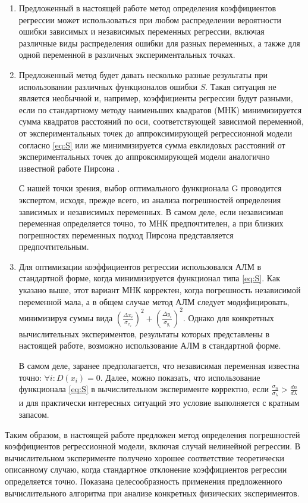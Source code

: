 \documentclass[11pt,a4paper]{article}
\theoremstyle{definition}
\begin{document}
\begin{enumerate}
  \item Предложенный в настоящей работе метод определения коэффициентов
    регрессии может использоваться при любом распределении
    вероятности ошибки зависимых и независимых переменных регрессии,
    включая различные виды распределения ошибки для разных переменных, а
    также для одной переменной в различных экспериментальных точках.
  \item Предложенный метод будет давать несколько разные результаты при
    использовании различных функционалов ошибки $S$. Такая ситуация
    не является необычной и, например, коэффициенты регрессии будут разными,
    если по стандартному методу наименьших квадратов (МНК) минимизируется
    сумма квадратов расстояний по оси, соответствующей зависимой переменной, от экспериментальных точек до
	аппроксимирующей регрессионной модели согласно \eqref{eq:S} или же минимизируется сумма
    евклидовых расстояний от экспериментальных точек до аппроксимирующей
	модели аналогично известной работе Пирсона \cite{pearson1901}.

	С нашей точки зрения, выбор оптимального функционала G
	проводится экспертом, исходя, прежде всего, из анализа погрешностей
	определения зависимых и независимых переменных. В самом деле, если
	независимая переменная определяется точно, то МНК предпочтителен, а при
	близких погрешностях переменных подход Пирсона представляется
	предпочтительным.
  \item Для оптимизации коэффициентов регрессии использовался
	АЛМ в стандартной форме, когда минимизируется функционал типа \eqref{eq:S}. Как
	указано выше, этот вариант МНК корректен, когда погрешность независимой
	переменной мала, а в общем случае метод АЛМ следует модифицировать,
	минимизируя суммы вида $(\frac{\Delta x_i}{\sigma_{x_i}})^2 + (\frac{\Delta y_i}{\sigma_{y_i}})^2$. Однако для конкретных
	вычислительных экспериментов, результаты которых представлены в
	настоящей работе, возможно использование АЛМ в стандартной форме.

	В самом деле, заранее предполагается, что независимая
	переменная известна точно: $\forall i : D(x_i) = 0$. Далее, можно показать, что
	использование функционала \eqref{eq:S} в вычислительном эксперименте
	корректно, если $\frac{\sigma_n}{\sigma_{\lambda}} > \frac{dn}{d\lambda}$ и для практически интересных ситуаций это
	условие выполняется с кратным запасом.
\end{enumerate}

Таким образом, в настоящей работе предложен метод определения
погрешностей коэффициентов регрессионной модели, включая случай нелинейной регрессии. В
вычислительном эксперименте получено хорошее соответствие теоретически описанному случаю, когда
стандартное отклонение коэффициентов регрессии определяется точно.
Показана целесообразность применения предложенного вычислительного
алгоритма при анализе конкретных физических экспериментов.

\FloatBarrier


%
%

\end{document}
